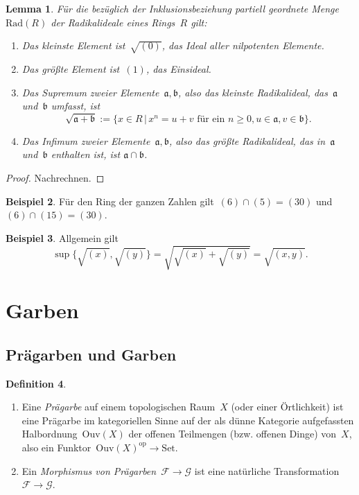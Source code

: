 \documentclass[a4paper,ngerman,12pt]{scrartcl}
\theoremstyle{definition}
\newtheorem{defn}{Definition}[section]
\newtheorem{bsp}[defn]{Beispiel}
\theoremstyle{plain}
\newtheorem{lemma}[defn]{Lemma}
\theoremstyle{remark}
\renewcommand{\aa}{\mathfrak{a}}
\newcommand{\bb}{\mathfrak{b}}
\newcommand{\F}{\mathcal{F}}
\newcommand{\G}{\mathcal{G}}
\newcommand{\Ouv}{\mathrm{Ouv}}
\newcommand{\Rad}{\mathrm{Rad}}
\newcommand{\op}{\mathrm{op}}
\newcommand{\Set}{\mathrm{Set}}
\renewcommand{\_}{\mathpunct{.}\,}
\newcommand{\?}{\,{:}\,}
\begin{document}
\begin{lemma}\label{lemma:rad}%
Für die bezüglich der Inklusionsbeziehung partiell geordnete Menge~$\Rad(R)$
der Radikalideale eines Rings~$R$ gilt:
\begin{enumerate}
\item Das kleinste Element ist~$\sqrt{(0)}$, das Ideal aller nilpotenten
Elemente.
\item Das größte Element ist~$(1)$, das Einsideal.
\item Das Supremum zweier Elemente~$\aa,\bb$, also das kleinste Radikalideal,
das~$\aa$ und~$\bb$ umfasst, ist
\[ \sqrt{\aa + \bb} := \{ x \in R \,|\, \text{$x^n = u + v$ für ein~$n \geq 0,
u \in \aa, v \in \bb$} \}. \]
\item Das Infimum zweier Elemente~$\aa,\bb$, also das größte Radikalideal,
das in~$\aa$ und~$\bb$ enthalten ist, ist $\aa \cap \bb$.
\end{enumerate}
\end{lemma}
\begin{proof}Nachrechnen.\end{proof}

\begin{bsp}Für den Ring der ganzen Zahlen gilt~$(6) \cap (5) = (30)$ und~$(6)
\cap (15) = (30)$.\end{bsp}

\begin{bsp}Allgemein gilt
\[ \sup\bigl\{ \sqrt{(x)}, \sqrt{(y)} \bigr\} = \sqrt{\sqrt{(x)} + \sqrt{(y)}} =
\sqrt{(x,y)}. \]
\end{bsp}


\section{Garben}

\label{appendix:garben}

\subsection{Prägarben und Garben}

\begin{defn}\begin{enumerate}
\item Eine \emph{Prägarbe} auf einem topologischen Raum~$X$ (oder einer
Örtlichkeit) ist eine Prägarbe im kategoriellen Sinne auf der
als dünne Kategorie aufgefassten Halb\-ord\-nung~$\Ouv(X)$ der offenen
Teilmengen (bzw.  offenen Dinge) von~$X$, also ein Funktor~$\Ouv(X)^\op \to
\Set$.
\item Ein \emph{Morphismus von Prägarben}~$\F \to \G$ ist eine natürliche
Transformation~$\F \to \G$.
\end{enumerate}
\end{defn}
\end{document}
